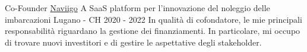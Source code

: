 
\begin{cventries}
  \cventry
    {Co-Founder} %
    {\href{https://www.naviigo.com}{Naviigo}} %
    {A SaaS platform per l'innovazione del noleggio delle imbarcazioni}
    {Lugano - CH} %
    {2020 -  2022} %
    {
      In qualità di cofondatore, le mie principali responsabilità riguardano la gestione dei finanziamenti. In particolare, mi occupo di trovare nuovi investitori e di gestire le aspettative degli stakeholder.
    }
\end{cventries}